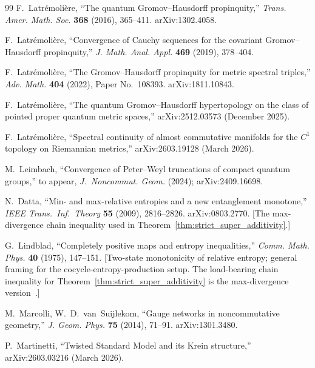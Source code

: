 \documentclass[11pt,a4paper]{article}
\theoremstyle{plain}
\theoremstyle{definition}
\begin{document}
\begin{thebibliography}{99}
F.~Latr\'emoli\`ere, ``The quantum Gromov--Hausdorff propinquity,''
\emph{Trans. Amer. Math. Soc.} \textbf{368} (2016), 365--411.
arXiv:1302.4058.

F.~Latr\'emoli\`ere, ``Convergence of Cauchy sequences for the
covariant Gromov--Hausdorff propinquity,'' \emph{J. Math. Anal. Appl.}
\textbf{469} (2019), 378--404.

F.~Latr\'emoli\`ere, ``The Gromov--Hausdorff propinquity for
metric spectral triples,'' \emph{Adv. Math.} \textbf{404} (2022),
Paper No.~108393. arXiv:1811.10843.

F.~Latr\'emoli\`ere, ``The quantum Gromov--Hausdorff hypertopology on
the class of pointed proper quantum metric spaces,''
arXiv:2512.03573 (December 2025).

F.~Latr\'emoli\`ere, ``Spectral continuity of almost commutative
manifolds for the $C^{1}$ topology on Riemannian metrics,''
arXiv:2603.19128 (March 2026).

M.~Leimbach, ``Convergence of Peter--Weyl
truncations of compact quantum groups,'' to appear, \emph{J.~Noncommut.
Geom.} (2024); arXiv:2409.16698.

N.~Datta, ``Min- and max-relative entropies and a new entanglement
monotone,'' \emph{IEEE Trans.\ Inf.\ Theory} \textbf{55} (2009),
2816--2826. arXiv:0803.2770.
[The max-divergence chain inequality used in
Theorem~\ref{thm:strict_super_additivity}.]

G.~Lindblad, ``Completely positive maps and entropy inequalities,''
\emph{Comm. Math. Phys.} \textbf{40} (1975), 147--151.
[Two-state monotonicity of relative entropy; general framing for
the cocycle-entropy-production setup. The load-bearing chain
inequality for Theorem~\ref{thm:strict_super_additivity} is the
max-divergence version~\cite{datta2009}.]

M.~Marcolli, W.~D.~van~Suijlekom, ``Gauge networks in noncommutative
geometry,'' \emph{J. Geom. Phys.} \textbf{75} (2014), 71--91.
arXiv:1301.3480.

P.~Martinetti, ``Twisted Standard Model and its Krein structure,''
arXiv:2603.03216 (March 2026).


\end{thebibliography}
\end{document}
